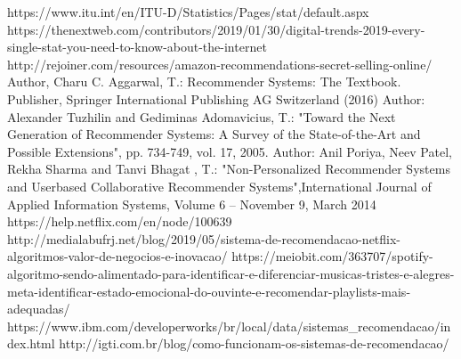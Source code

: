 \documentclass[runningheads]{llncs}
\begin{document}


\newpage
\hfill









%
%
%
% 
% 
%
\begin{thebibliography}{8}

https://www.itu.int/en/ITU-D/Statistics/Pages/stat/default.aspx
https://thenextweb.com/contributors/2019/01/30/digital-trends-2019-every-single-stat-you-need-to-know-about-the-internet
http://rejoiner.com/resources/amazon-recommendations-secret-selling-online/
Author, Charu C. Aggarwal, T.: Recommender Systems: The Textbook. Publisher, Springer International Publishing AG Switzerland (2016)
Author: Alexander Tuzhilin and Gediminas Adomavicius, T.: "Toward the Next Generation of Recommender Systems: A Survey of the State-of-the-Art and Possible Extensions", pp. 734-749, vol. 17, 2005.
Author: Anil Poriya, Neev Patel, Rekha Sharma and Tanvi Bhagat , T.: "Non-Personalized Recommender Systems and Userbased Collaborative Recommender Systems",International Journal of Applied Information Systems, Volume 6 – November 9, March 2014
 {https://help.netflix.com/en/node/100639}
 {http://medialabufrj.net/blog/2019/05/sistema-de-recomendacao-netflix-algoritmos-valor-de-negocios-e-inovacao/}
 {https://meiobit.com/363707/spotify-algoritmo-sendo-alimentado-para-identificar-e-diferenciar-musicas-tristes-e-alegres-meta-identificar-estado-emocional-do-ouvinte-e-recomendar-playlists-mais-adequadas/
}
 {https://www.ibm.com/developerworks/br/local/data/sistemas\_recomendacao/index.html}
 {http://igti.com.br/blog/como-funcionam-os-sistemas-de-recomendacao/}


\end{thebibliography}
\end{document}
